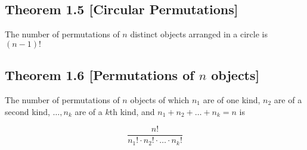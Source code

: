 \documentclass{article}
\begin{document}
\subsection*{Theorem 1.5 [Circular Permutations]} The number of permutations of \(n\) distinct objects arranged in a circle is \((n-1)!\)

\subsection*{Theorem 1.6 [Permutations of \(n\) objects]} The number of permutations of \(n\) objects of which \(n_1\) are of one kind, \(n_2\) are of a second kind, \(\ldots, n_k\) are of a \(k\)th kind, and \(n_1+n_2+\dots+n_k=n\) is

\[\frac{n!}{n_1! \cdot n_2! \cdot \ldots \cdot n_k!}\]
\end{document}
